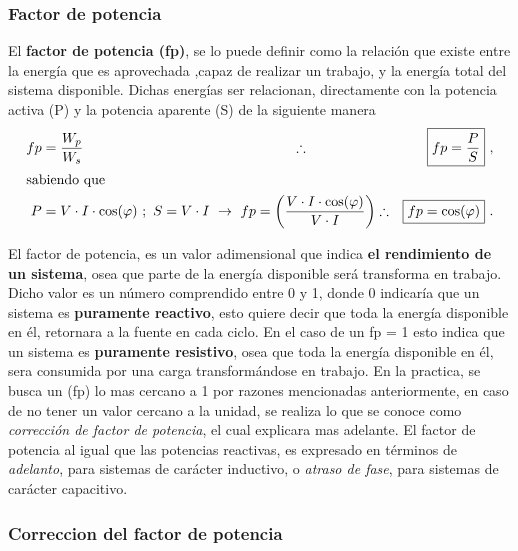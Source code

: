          \subsubsection{Factor de potencia}
         
               El \textbf{factor de potencia (fp)}, se lo puede definir como la relación que
               existe entre la energía que es aprovechada ,capaz de realizar un trabajo, y la 
               energía total del sistema disponible.
               Dichas energías ser relacionan, directamente con la potencia activa (P) y 
               la potencia aparente (S) de la siguiente manera
               \begin{align}
                  fp &= \frac{W_p}{W_s} \hspace{150pt} \therefore \Aboxed{fp = \frac{P}{S}} \ , \notag \\
                  \intertext{sabiendo que}
                  P  &= V\cdot I\cdot \cos(\varphi) \ ; \ S = V\cdot I \ \rightarrow 
                  \ fp = \left(\dfrac{V\cdot I\cdot \cos(\varphi) }{V\cdot I}\right) 
                  \therefore \Aboxed{fp = \cos(\varphi)} \ . \label{eqn:fpFinal} 
               \end{align}

               El factor de potencia, es un valor adimensional que indica 
               \textbf{el rendimiento de un sistema}, osea que parte de la energía disponible 
               será transforma en trabajo. Dicho valor es un número comprendido entre 0 y 1, 
               donde 0 indicaría que un sistema es \textbf{puramente reactivo}, esto quiere 
               decir que toda la energía disponible en él, retornara a la fuente en cada ciclo. 
               En el caso de un fp = 1 esto indica que un sistema es \textbf{puramente resistivo}, 
               osea que toda la energía disponible en él, sera consumida por una carga
               transformándose en trabajo. En la practica, se busca un (fp) lo mas
               cercano a 1 por razones mencionadas anteriormente, en caso de no tener un valor
               cercano a la unidad, se realiza lo que se conoce como \textit{corrección de
               factor de potencia}, el cual explicara mas adelante. 
               El factor de potencia al igual que las potencias reactivas, es expresado en 
               términos de \textit{adelanto}, para sistemas de carácter inductivo, o 
               \textit{atraso de fase}, para sistemas de carácter capacitivo.

            \subsubsection{Correccion del factor de potencia}
               
